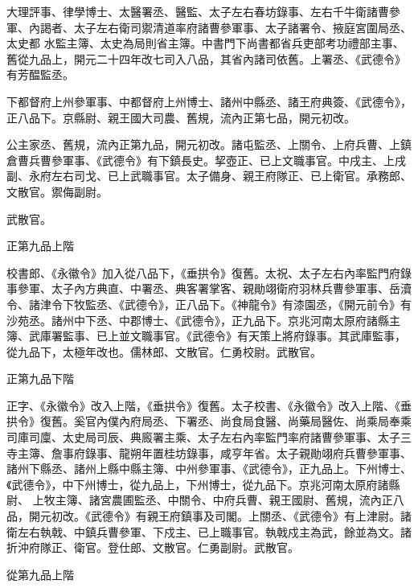\begin{pinyinscope}
 大理評事、律學博士、太醫署丞、醫監、太子左右春坊錄事、左右千牛衛諸曹參軍、內謁者、太子左右衛司禦清道率府諸曹參軍事、太子諸署令、掖庭宮圍局丞、太史都
 水監主簿、太史為局則省主簿。中書門下尚書都省兵吏部考功禮部主事、舊從九品上，開元二十四年改七司入八品，其省內諸司依舊。上署丞、《武德令》有芳醖監丞。



 下都督府上州參軍事、中都督府上州博士、諸州中縣丞、諸王府典簽、《武德令》，正八品下。京縣尉、親王國大司農、舊規，流內正第七品，開元初改。



 公主家丞、舊規，流內正第九品，開元初改。諸屯監丞、上關令、上府兵曹、上鎮倉曹兵曹參軍事、《武德令》有下鎮長史。挈壺正、已上文職事官。中戌主、上戌副、永府左右司戈、已上武職事官。太子備身、親王府隊正、已上衛官。承務郎、文散官。禦侮副尉。



 武散官。



 正第九品上階



 校書郎、《永徽令》加入從八品下，《垂拱令》復舊。太祝、太子左右內率監門府錄事參軍、太子內方典直、中署丞、典客署掌客、親勛翊衛府羽林兵曹參軍事、岳瀆令、諸津令下牧監丞、《武德令》，正八品下。《神龍令》有漆園丞，《開元前令》有沙苑丞。諸州中下丞、中郡博士、《武德令》，正九品下。京兆河南太原府諸縣主簿、武庫署監事、已上並文職事官。《武德令》有天策上將府錄事。其武庫監事，從九品下，太極年改也。儒林郎、文散官。仁勇校尉。武散官。



 正第九品下階



 正字、《永徽令》改入上階，《垂拱令》復舊。太子校書、《永徽令》改入上階、《垂拱令》復舊。奚官內僕內府局丞、下署丞、尚食局食醫、尚藥局醫佐、尚乘局奉乘司庫司廩、太史局司辰、典廄署主乘、太子左右內率監門率府諸曹參軍事、太子三寺主簿、詹事府錄事、龍朔年置桂坊錄事，咸亨年省。太子親勛翊府兵曹參軍事、諸州下縣丞、諸州上縣中縣主簿、中州參軍事、《武德令》，正九品上。下州博士、《武德令》，中下州博士，從九品上，下州博士，從九品下。京兆河南太原府諸縣尉、
 上牧主簿、諸宮農圃監丞、中關令、中府兵曹、親王國尉、舊規，流內正八品，開元初改。《武德令》有親王府鎮事及司閣。上關丞、《武德令》有上津尉。諸衛左右執戟、中鎮兵曹參軍、下戍主、已上職事官。執戟戍主為武，餘並為文。諸折沖府隊正、衛官。登仕郎、文散官。仁勇副尉。武散官。



 從第九品上階




\end{pinyinscope}
